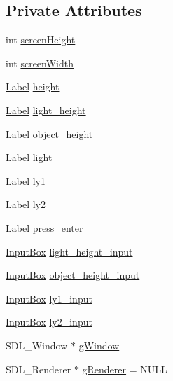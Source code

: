 \subsection*{Private Attributes}
\begin{DoxyCompactItemize}
\item 
int \mbox{\hyperlink{class_light_interface_aa9b68ae929eb75c73308d3a54938fbbb}{screen\+Height}}
\item 
int \mbox{\hyperlink{class_light_interface_a9277a0dc36c29a260049770cc1178a72}{screen\+Width}}
\item 
\mbox{\hyperlink{class_label}{Label}} \mbox{\hyperlink{class_light_interface_a6bc5e964dd25d0dc1e0355c46fe8d398}{height}}
\item 
\mbox{\hyperlink{class_label}{Label}} \mbox{\hyperlink{class_light_interface_aa58890ac548646f9dae6877b4f209537}{light\+\_\+height}}
\item 
\mbox{\hyperlink{class_label}{Label}} \mbox{\hyperlink{class_light_interface_a7817cd9d858aa380d92590c236fbdd29}{object\+\_\+height}}
\item 
\mbox{\hyperlink{class_label}{Label}} \mbox{\hyperlink{class_light_interface_aea6dc2cfd46096da7ce9957e14fda8ca}{light}}
\item 
\mbox{\hyperlink{class_label}{Label}} \mbox{\hyperlink{class_light_interface_acc12c2e0b27d50d03698065cfe2de51e}{ly1}}
\item 
\mbox{\hyperlink{class_label}{Label}} \mbox{\hyperlink{class_light_interface_a04a82049e33f9c021b3ff203e167e68e}{ly2}}
\item 
\mbox{\hyperlink{class_label}{Label}} \mbox{\hyperlink{class_light_interface_a7b1d86c00aa815d87dea877b1253ff26}{press\+\_\+enter}}
\item 
\mbox{\hyperlink{class_input_box}{Input\+Box}} \mbox{\hyperlink{class_light_interface_a6f04fc8e8b866c75e2a6f5d22e5d1250}{light\+\_\+height\+\_\+input}}
\item 
\mbox{\hyperlink{class_input_box}{Input\+Box}} \mbox{\hyperlink{class_light_interface_ada7575dbd781d02d2bf5cf1f03db679e}{object\+\_\+height\+\_\+input}}
\item 
\mbox{\hyperlink{class_input_box}{Input\+Box}} \mbox{\hyperlink{class_light_interface_ae94bb6c1f6372a8bbb826d1f0c47451f}{ly1\+\_\+input}}
\item 
\mbox{\hyperlink{class_input_box}{Input\+Box}} \mbox{\hyperlink{class_light_interface_a3ca039b10b37dc7d77ce103e4a8d3e43}{ly2\+\_\+input}}
\item 
S\+D\+L\+\_\+\+Window $\ast$ \mbox{\hyperlink{class_light_interface_a382f317eb245f9bd631766002b37e127}{g\+Window}}
\item 
S\+D\+L\+\_\+\+Renderer $\ast$ \mbox{\hyperlink{class_light_interface_a2913f291762246850a74fe760ea32d8c}{g\+Renderer}} = N\+U\+LL
\end{DoxyCompactItemize}


